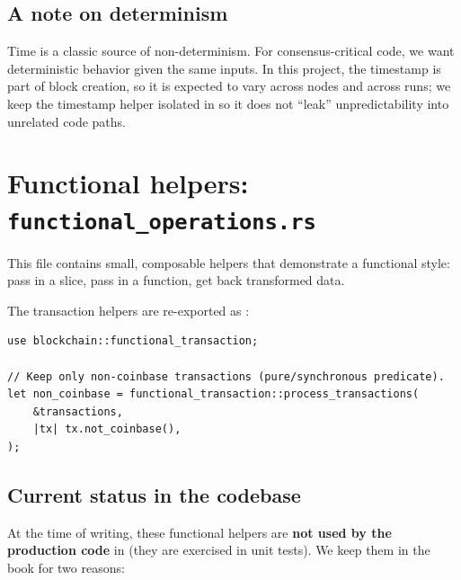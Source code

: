 \subsection{A note on determinism}
\label{sec:ch07-determinism}

Time is a classic source of non-determinism. For consensus-critical code, we want
deterministic behavior given the same inputs. In this project, the timestamp is part of
block creation, so it is expected to vary across nodes and across runs; we keep the
timestamp helper isolated in  so it does not ``leak'' unpredictability into
unrelated code paths.

\section{Functional helpers: \texttt{functional\_operations.rs}}
\label{sec:ch07-functional}

This file contains small, composable helpers that demonstrate a functional style: pass in
a slice, pass in a function, get back transformed data.

The transaction helpers are re-exported as :

\begin{listing}[htbp]
\caption{Using functional transaction helpers}
\label{lst:7-4}
\begin{verbatim}
use blockchain::functional_transaction;

// Keep only non-coinbase transactions (pure/synchronous predicate).
let non_coinbase = functional_transaction::process_transactions(
    &transactions,
    |tx| tx.not_coinbase(),
);
\end{verbatim}
\end{listing}

\subsection{Current status in the codebase}
\label{sec:ch07-functional-status}

At the time of writing, these functional helpers are \textbf{not used by the production
code} in  (they are exercised in  unit tests). We
keep them in the book for two reasons:

